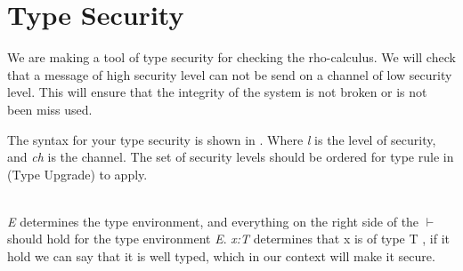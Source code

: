 \section{Type Security}
We are making a tool of type security for checking the rho-calculus.
We will check that a message of high security level can not be send on a channel of low security level.
This will ensure that the integrity of the system is not broken or is not been miss used.


The syntax for your type security is shown in . Where \textit{l} is the level of security, and \textit{ch} is the channel. The set of security levels should be ordered for type rule in  (Type Upgrade) to apply.\\\\


\textit{E} determines the type environment, and everything on the right side of the $ \vdash $ should hold for the type environment \textit{E}. \textit{x:T} determines that x is of type T , if it hold we can say that it is well typed, which in our context will make it secure.

